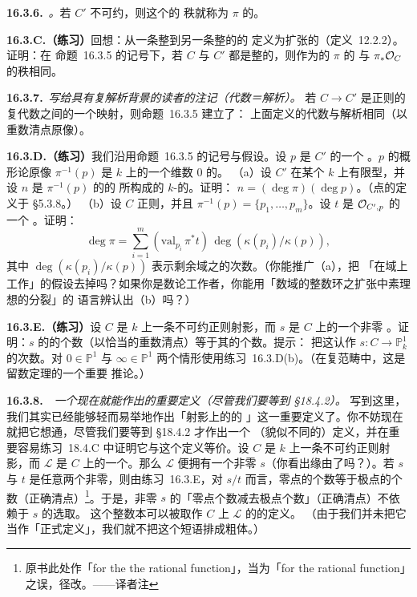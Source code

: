\textbf{16.3.6.}\ \emph{\trhDefinition{}。}\quad 若 $C'$ 不可约，则这个\trLocallyFreeSheaf{}的
秩就称为 $\pi$ 的\textbf{\trDegree}。

\textbf{16.3.C.（练习）}\quad 回想：从一条整\trCurve{}到另一条整\trCurve{}的\trRationalMap{}的%
\trDegree{}定义为\trFunctionField{}扩张的\trDegree（\mbox{定义~12.2.2}）。证明：在
\mbox{命题~16.3.5} 的记号下，若 $C$ 与 $C'$ 都是整的，则作为\trRationalMap{}的 $\pi$ 的%
\trDegree{}与 $\pi_*\mathcal{O}_C$ 的秩相同。

\textbf{16.3.7.}\ \emph{写给具有复解析背景的读者的注记（代数\trDegree{}＝解析\trDegree）。}\quad
若 $C\to C'$ 是正则的复代数\trCurve{}之间的一个\trFinite{}映射，则\mbox{命题~16.3.5} 建立了：
上面定义的代数\trDegree{}与解析\trDegree{}相同（以重数清点原像）。

\textbf{16.3.D.（练习）}\quad 我们沿用\mbox{命题~16.3.5} 的记号与假设。设 $p$ 是 $C'$ 的一个%
\trClosedPoint。$p$ 的概形论原像 $\pi^{-1}(p)$ 是 $k$ 上的一个维数 $0$ 的\trScheme。
（a）设 $C'$ 在某个\trField{} $k$ 上有限型，并设 $n$ 是 $\pi^{-1}(p)$ 的\trStructureSheaf{}的%
\trGlobalSections{}所构成的 $k$-\trVectorSpace{}的\trDimension。证明：
$n=(\deg\pi)(\deg p)$。（点的\trDegree{}定义于 \S5.3.8。）
（b）设 $C$ 正则，并且 $\pi^{-1}(p)=\{p_1,\dots,p_m\}$。设 $t$ 是\trDVR{} $\mathcal{O}_{C',p}$ 的一个%
\trUniformizer。证明：
\[
\deg\pi=\sum_{i=1}^{m}(\mathrm{val}_{p_i}\,\pi^*t)\,\deg(\kappa(p_i)/\kappa(p)),
\]
其中 $\deg(\kappa(p_i)/\kappa(p))$ 表示剩余域之\trFieldExtension{}的次数。（你能推广（a），把
「在域上工作」的假设去掉吗？如果你是数论工作者，你能用「数域的整数环之扩张中素理想的分裂」的
语言辨认出（b）吗？）

\textbf{16.3.E.（练习）}\quad 设 $C$ 是 $k$ 上一条不可约正则射影\trCurve，而 $s$ 是 $C$ 上的一个非零%
\trRationalFunction。证明：$s$ 的\trZeros{}的个数（以恰当的重数清点）等于其\trPole{}的个数。提示：
把这认作\trMorphism{} $s\colon C\to\mathbb{P}^1_k$ 的次数。对 $0\in\mathbb{P}^1$ 与
$\infty\in\mathbb{P}^1$ 两个情形使用\mbox{练习~16.3.D}(b)。（在复范畴中，这是留数定理的一个重要
推论。）

\textbf{16.3.8.}\ \extrahard\ \emph{一个现在就能作出的重要定义（尽管我们要等到 \S18.4.2）。}\quad
写到这里，我们其实已经能够轻而易举地作出「\trSmooth{}射影\trCurve{}上的\trLineBundle{}的%
\trDegree{}」这一重要定义了。你不妨现在就把它想通，尽管我们要等到 \S18.4.2 才作出一个
（貌似不同的）定义，并在\mbox{重要容易练习~18.4.C} 中证明它与这个定义等价。设 $C$ 是 $k$
上一条不可约正则射影\trCurve，而 $\mathscr{L}$ 是 $C$ 上的一个\trLineBundle。那么
$\mathscr{L}$ 便拥有一个非零\trRational\trSection{} $s$（你看出缘由了吗？）。若 $s$ 与
$t$ 是任意两个非零\trRational\trSection，则由\mbox{练习~16.3.E}，对\trRationalFunction{}
$s/t$ 而言，零点的个数等于极点的个数（正确清点）\footnote{原书此处作「for the the
rational function」，当为「for the rational function」之误，径改。——译者注}。于是，非零%
\trRational\trSection{} $s$ 的「零点个数减去极点个数」（正确清点）不依赖于 $s$ 的选取。
这个整数本可以被取作\trCurve{} $C$ 上\trLineBundle{} $\mathscr{L}$ 的\trDegree{}的定义。
（由于我们并未把它当作「正式定义」，我们就不把这个短语排成粗体。）

